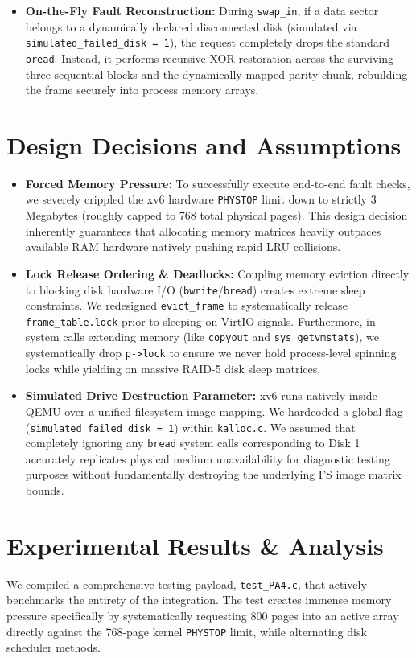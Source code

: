 \documentclass[11pt]{article}
\begin{document}
\begin{itemize}
    \item \textbf{On-the-Fly Fault Reconstruction:} During \texttt{swap\_in}, if a data sector belongs to a dynamically declared disconnected disk (simulated via \texttt{simulated\_failed\_disk = 1}), the request completely drops the standard \texttt{bread}. Instead, it performs recursive XOR restoration across the surviving three sequential blocks and the dynamically mapped parity chunk, rebuilding the frame securely into process memory arrays.
\end{itemize}

\section{Design Decisions and Assumptions}
\begin{itemize}
    \item \textbf{Forced Memory Pressure:} To successfully execute end-to-end fault checks, we severely crippled the xv6 hardware \texttt{PHYSTOP} limit down to strictly 3 Megabytes (roughly capped to 768 total physical pages). This design decision inherently guarantees that allocating memory matrices heavily outpaces available RAM hardware natively pushing rapid LRU collisions.
    \item \textbf{Lock Release Ordering \& Deadlocks:} Coupling memory eviction directly to blocking disk hardware I/O (\texttt{bwrite}/\texttt{bread}) creates extreme sleep constraints. We redesigned \texttt{evict\_frame} to systematically release \texttt{frame\_table.lock} prior to sleeping on VirtIO signals. Furthermore, in system calls extending memory (like \texttt{copyout} and \texttt{sys\_getvmstats}), we systematically drop \texttt{p->lock} to ensure we never hold process-level spinning locks while yielding on massive RAID-5 disk sleep matrices.
    \item \textbf{Simulated Drive Destruction Parameter:} xv6 runs natively inside QEMU over a unified filesystem image mapping. We hardcoded a global flag (\texttt{simulated\_failed\_disk = 1}) within \texttt{kalloc.c}. We assumed that completely ignoring any \texttt{bread} system calls corresponding to Disk 1 accurately replicates physical medium unavailability for diagnostic testing purposes without fundamentally destroying the underlying FS image matrix bounds.
\end{itemize}

\section{Experimental Results \& Analysis}
We compiled a comprehensive testing payload, \texttt{test\_PA4.c}, that actively benchmarks the entirety of the integration. The test creates immense memory pressure specifically by systematically requesting 800 pages into an active array directly against the 768-page kernel \texttt{PHYSTOP} limit, while alternating disk scheduler methods. 
\end{document}
